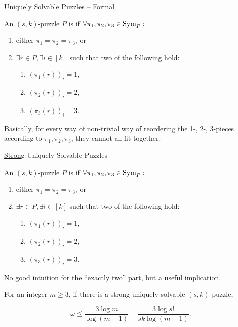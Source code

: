 \documentclass[t,10pt,
mathserif,xcolor=dvipsnames]{beamer}
\begin{document}
\begin{myframe}{Uniquely Solvable Puzzles -- Formal}
  
  \begin{definition}
    An $(s,k)$-puzzle $P$ is \emph{} if
    $\forall \pi_1, \pi_2, \pi_3 \in \mathrm{Sym}_{P}:$
    \begin{enumerate}
    \item either $\pi_1 = \pi_2 = \pi_3$, or
    \item $\exists r \in P, \exists i \in [k]$ such that  two
      of the following hold:
      \begin{enumerate}
      \item $(\pi_1(r))_i = 1$,
      \item $(\pi_2(r))_i = 2$,
      \item $(\pi_3(r))_i = 3$.
      \end{enumerate}
    \end{enumerate}
    
  \end{definition}

  Basically, for every way of non-trivial way of reordering the 1-,
  2-, 3-pieces according to $\pi_1, \pi_2, \pi_3$, they cannot all fit
  together.
    
  
\end{myframe}

\begin{myframe}{\uline{Strong} Uniquely Solvable Puzzles}

  \begin{definition}

    An $(s,k)$-puzzle $P$ is \emph{} if
    $\forall \pi_1, \pi_2, \pi_3 \in \mathrm{Sym}_{P}:$
    \begin{enumerate}
    \item either $\pi_1 = \pi_2 = \pi_3$, or
    \item $\exists r \in P, \exists i \in [k]$ such that  two
      of the following hold:
      \begin{enumerate}
      \item $(\pi_1(r))_i = 1$,
      \item $(\pi_2(r))_i = 2$,
      \item $(\pi_3(r))_i = 3$.
      \end{enumerate}
    \end{enumerate}

  \end{definition}

  No good intuition for the ``exactly two'' part, but a useful
  implication.

  \begin{lemma}
    For an integer $m \ge 3$, if there is a strong uniquely solvable
    $(s,k)$-puzzle, 

    $$\omega \le \frac{3 \log m}{\log(m-1)} - \frac{3 \log s!}{sk \log(m-1)}.$$
  \end{lemma}
  
\end{myframe}
\end{document}
